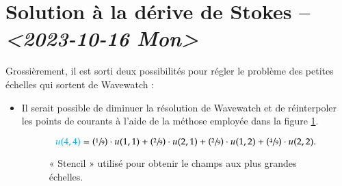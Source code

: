 \documentclass[10pt]{article}
\numberwithin{equation}{section}
\begin{document}
\section{Solution à la dérive de Stokes -- \textit{<2023-10-16 Mon>}}
\label{sec:orgd725159}
Grossièrement, il est sorti deux possibilités pour régler le problème des petites échelles qui sortent de Wavewatch :
\begin{itemize}
\item Il serait possible de diminuer la résolution de Wavewatch et de réinterpoler les points de courants à l'aide de la méthose employée dans la figure \ref{org3d68a6c}.

\begin{figure}[h!]
\begin{center}
\end{center}
\begin{equation}
   {\color{cyan}u(4,4)} = \qty(\sfrac{1}{9})\cdot u(1,1) + \qty(\sfrac{2}{9})\cdot u(2,1) + \qty(\sfrac{2}{9})\cdot u(1,2) + \qty(\sfrac{4}{9})\cdot u(2,2).
\end{equation}
\caption{\label{org3d68a6c}« Stencil » utilisé pour obtenir le champs aux plus grandes échelles.}
\end{figure}
\end{itemize}





\end{document}
